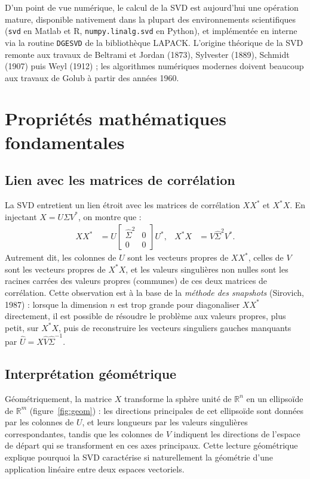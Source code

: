 \documentclass[11pt,a4paper]{article}
\newcommand{\R}{\mathbb{R}}
\begin{document}
D'un point de vue numérique, le calcul de la SVD est aujourd'hui une opération mature, disponible nativement dans la plupart des environnements scientifiques (\texttt{svd} en Matlab et R, \texttt{numpy.linalg.svd} en Python), et implémentée en interne via la routine \texttt{DGESVD} de la bibliothèque LAPACK. L'origine théorique de la SVD remonte aux travaux de Beltrami et Jordan (1873), Sylvester (1889), Schmidt (1907) puis Weyl (1912) ; les algorithmes numériques modernes doivent beaucoup aux travaux de Golub à partir des années 1960.

\section{Propriétés mathématiques fondamentales}

\subsection{Lien avec les matrices de corrélation}

La SVD entretient un lien étroit avec les matrices de corrélation $XX^{*}$ et $X^{*}X$. En injectant $X = U\Sigma V^{*}$, on montre que :
\begin{align}
XX^{*} &= U \begin{bmatrix} \hat\Sigma^2 & 0 \\ 0 & 0 \end{bmatrix} U^{*}, &
X^{*}X &= V \hat\Sigma^2 V^{*}.
\end{align}
Autrement dit, les colonnes de $U$ sont les vecteurs propres de $XX^{*}$, celles de $V$ sont les vecteurs propres de $X^{*}X$, et les valeurs singulières non nulles sont les racines carrées des valeurs propres (communes) de ces deux matrices de corrélation. Cette observation est à la base de la \emph{méthode des snapshots} (Sirovich, 1987) : lorsque la dimension $n$ est trop grande pour diagonaliser $XX^{*}$ directement, il est possible de résoudre le problème aux valeurs propres, plus petit, sur $X^{*}X$, puis de reconstruire les vecteurs singuliers gauches manquants par $\hat U = X \hat V \hat \Sigma^{-1}$.

\subsection{Interprétation géométrique}

Géométriquement, la matrice $X$ transforme la sphère unité de $\R^n$ en un ellipsoïde de $\R^m$ (figure~\ref{fig:geom}) : les directions principales de cet ellipsoïde sont données par les colonnes de $U$, et leurs longueurs par les valeurs singulières correspondantes, tandis que les colonnes de $V$ indiquent les directions de l'espace de départ qui se transforment en ces axes principaux. Cette lecture géométrique explique pourquoi la SVD caractérise si naturellement la géométrie d'une application linéaire entre deux espaces vectoriels.
\end{document}
